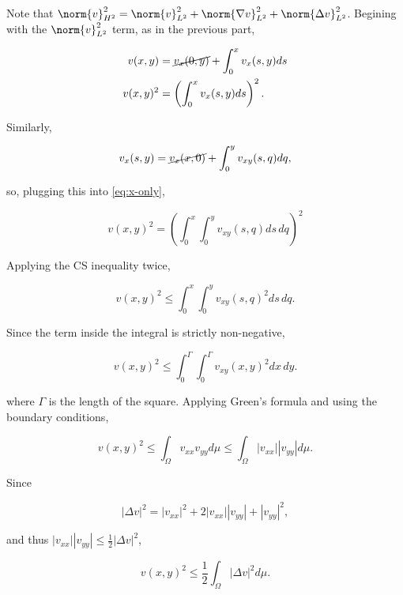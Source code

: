 \documentclass{hw-template}
\newcommand{\intOm}{\int_{\Omega}}
\newcommand{\ltwo}{{L^2}}
\newcommand{\htwo}{{H^2}}
\begin{document}
Note that $\norm{v}_\htwo^2 = \norm{v}_\ltwo^2 + \norm{\nabla v}_\ltwo^2 + \norm{\Delta v}_\ltwo^2$. Begining with the $\norm{v}_\ltwo^2$ term, as in the previous part,

\begin{align}
    v(x, y) &= \cancel{v_x(0, y)} + \int_0^x v_x(s, y)ds\\
    v(x, y)^2 &=\left(\int_0^x v_x(s, y)ds\right)^2\label{eq:x-only}.
\end{align}

Similarly,

\begin{equation}
    v_x(s, y) = \cancel{v_x(x, 0)} + \int_0^y v_{xy}(s,q)dq,
\end{equation}

so, plugging this into \autoref{eq:x-only},

\begin{equation}
    v(x, y)^2 = \left(\int_0^x \int_0^y v_{xy}(s,q)ds \, dq \right)^2
\end{equation}

Applying the CS inequality twice,

\begin{equation}
    v(x, y)^2 \leq \int_0^x \int_0^y v_{xy}(s,q)^2 ds \, dq.
\end{equation}

Since the term inside the integral is strictly non-negative,

\begin{equation}
    v(x, y)^2 \leq \int_0^\Gamma \int_0^\Gamma v_{xy}(x, y)^2 dx \, dy.
\end{equation}

where $\Gamma$ is the length of the square. Applying Green's formula and using the boundary conditions,

\begin{equation}
    v(x, y)^2 \leq \intOm v_{xx}v_{yy}d\mu \leq \intOm |v_{xx}||v_{yy}|d\mu.
\end{equation}

Since 

\begin{equation}
    |\Delta v|^2 = |v_{xx}|^2 + 2 |v_{xx}| |v_{yy}| + |v_{yy}|^2,\label{eq:expansion}
\end{equation}

and thus $|v_{xx}| |v_{yy}| \leq \frac{1}{2}|\Delta v|^2$,

\begin{equation}
    v(x, y)^2 \leq \frac{1}{2} \intOm |\Delta v|^2 d\mu.
\end{equation}
\end{document}
